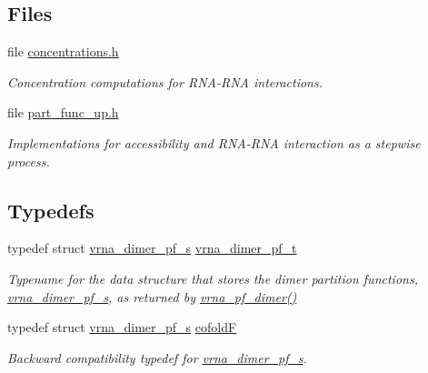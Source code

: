 \subsection*{Files}
\begin{DoxyCompactItemize}
\item 
file \hyperlink{concentrations_8h}{concentrations.\+h}
\begin{DoxyCompactList}\small\item\em Concentration computations for R\+N\+A-\/\+R\+NA interactions. \end{DoxyCompactList}\item 
file \hyperlink{part__func__up_8h}{part\+\_\+func\+\_\+up.\+h}
\begin{DoxyCompactList}\small\item\em Implementations for accessibility and R\+N\+A-\/\+R\+NA interaction as a stepwise process. \end{DoxyCompactList}\end{DoxyCompactItemize}
\subsection*{Typedefs}
\begin{DoxyCompactItemize}
\item 
\mbox{\label{group__pf__cofold_ga444df1587c9a2ca15b8eb25188f629c3}} 
typedef struct \hyperlink{group__part__func__global_structvrna__dimer__pf__s}{vrna\+\_\+dimer\+\_\+pf\+\_\+s} \hyperlink{group__pf__cofold_ga444df1587c9a2ca15b8eb25188f629c3}{vrna\+\_\+dimer\+\_\+pf\+\_\+t}
\begin{DoxyCompactList}\small\item\em Typename for the data structure that stores the dimer partition functions, \hyperlink{group__part__func__global_structvrna__dimer__pf__s}{vrna\+\_\+dimer\+\_\+pf\+\_\+s}, as returned by \hyperlink{group__part__func__global_ga4e5c7d06c302a7c59fc0d64dc142ca63}{vrna\+\_\+pf\+\_\+dimer()} \end{DoxyCompactList}\item 
\mbox{\label{group__pf__cofold_ga5445d8d96a40e9e79b1fa5a7f1a6b7ea}} 
typedef struct \hyperlink{group__part__func__global_structvrna__dimer__pf__s}{vrna\+\_\+dimer\+\_\+pf\+\_\+s} \hyperlink{group__pf__cofold_ga5445d8d96a40e9e79b1fa5a7f1a6b7ea}{cofoldF}
\begin{DoxyCompactList}\small\item\em Backward compatibility typedef for \hyperlink{group__part__func__global_structvrna__dimer__pf__s}{vrna\+\_\+dimer\+\_\+pf\+\_\+s}. \end{DoxyCompactList}\end{DoxyCompactItemize}
